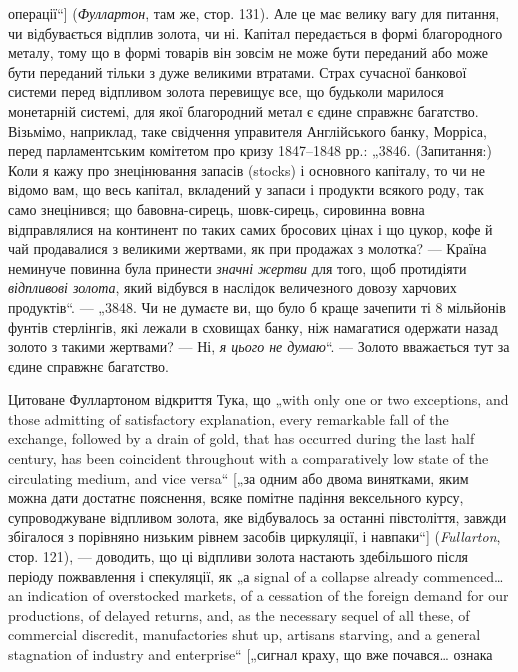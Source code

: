 операції“] (\emph{Фуллартон}, там же, стор. 131). Але це має велику
вагу для питання, чи відбувається відплив золота, чи ні. Капітал
передається в формі благородного металу, тому що в формі
товарів він зовсім не може бути переданий або може бути
переданий тільки з дуже великими втратами. Страх сучасної
банкової системи перед відпливом золота перевищує все, що
будьколи марилося монетарній системі, для якої благородний
метал є єдине справжнє багатство. Візьмімо, наприклад, таке
свідчення управителя Англійського банку, Морріса, перед парламентським
комітетом про кризу 1847--1848 рр.: „3846. (Запитання:)
Коли я кажу про знецінювання запасів (stocks) і основного
капіталу, то чи не відомо вам, що весь капітал, вкладений у запаси
і продукти всякого роду, так само знецінився; що бавовна-сирець,
шовк-сирець, сировинна вовна відправлялися на континент
по таких самих бросових цінах і що цукор, кофе й чай продавалися
з великими жертвами, як при продажах з молотка? — Країна
неминуче повинна була принести \emph{значні жертви} для того, щоб
протидіяти \emph{відпливові золота}, який відбувся в наслідок величезного
довозу харчових продуктів“. — „3848. Чи не думаєте
ви, що було б краще зачепити ті 8 мільйонів фунтів стерлінгів, які
лежали в сховищах банку, ніж намагатися одержати назад золото
з такими жертвами? — Ні, \emph{я цього не думаю}“. — Золото вважається
тут за єдине справжнє багатство.

Цитоване Фуллартоном відкриття Тука, що „with only one
or two exceptions, and those admitting of satisfactory explanation,
every remarkable fall of the exchange, followed by a drain of gold,
that has occurred during the last half century, has been coincident
throughout with a comparatively low state of the circulating medium,
and vice versa“ [„за одним або двома винятками, яким
можна дати достатнє пояснення, всяке помітне падіння вексельного
курсу, супроводжуване відпливом золота, яке відбувалось
за останні півстоліття, завжди збігалося з порівняно низьким
рівнем засобів циркуляції, і навпаки“] (\emph{Fullarton}, стор. 121), —
доводить, що ці відпливи золота настають здебільшого після періоду
пожвавлення і спекуляції, як „а signal of a collapse already
commenced\dots{} an indication of overstocked markets, of a cessation
of the foreign demand for our productions, of delayed returns, and,
as the necessary sequel of all these, of commercial discredit, manufactories
shut up, artisans starving, and a general stagnation of
industry and enterprise“ [„сигнал краху, що вже почався\dots{} ознака
\parbreak{}  %
